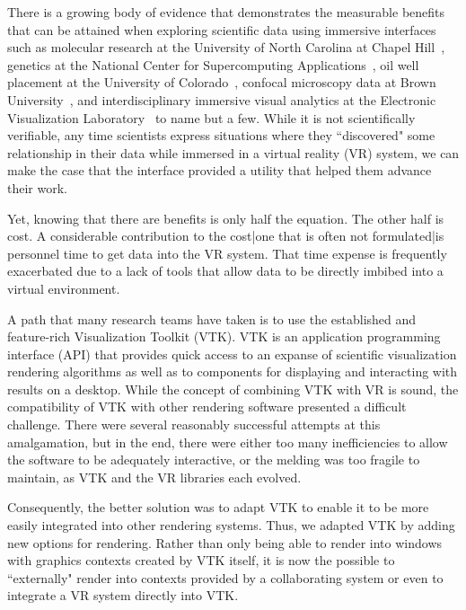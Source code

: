 There is a growing body of evidence that demonstrates the measurable benefits that can be
attained when exploring scientific data using immersive interfaces such as
molecular research at the University of North Carolina at Chapel Hill~\cite{Brooks:1990},
genetics at the National Center for Supercomputing Applications~\cite{Brady:1995},
oil well placement at the University of Colorado~\cite{Gruchalla:2004},  confocal microscopy data at Brown University~\cite{Prabhat:2008}, and interdisciplinary immersive visual analytics at the Electronic Visualization Laboratory~\cite{Marai:2016} to name but a few.
While it is not scientifically verifiable, any time scientists
express situations where they ``discovered" some relationship in their data
while immersed in a virtual reality (VR) system, we can make the case that the
interface provided a utility that helped them advance their work.

Yet, knowing that there are benefits is only half the equation.
The other half is cost.
A considerable contribution to the cost|one that is often not
formulated|is personnel time to get data into the VR system.
That time expense is frequently exacerbated due to a lack of tools that
allow data to be directly imbibed into a virtual environment.

A path that many research teams have taken is to use the established and
feature-rich Visualization Toolkit (VTK).
VTK is an application programming interface (API) that provides quick access to an expanse
of scientific visualization rendering algorithms as well as to components
for displaying and interacting with results on a desktop.
While the concept of combining VTK with VR is sound, the
compatibility of VTK with other rendering software presented a difficult
challenge.  
There were several reasonably successful attempts at this amalgamation,
but in the end, there were either too many inefficiencies to allow the
software to be adequately interactive, or the melding was too fragile to
maintain, as VTK and the VR libraries each evolved.

Consequently, the better solution was to adapt VTK to enable it to be
more easily integrated into other rendering systems.
Thus, we adapted VTK by adding new options for rendering.
Rather than only being able to render into windows with graphics contexts
created by VTK itself, it is now the possible to ``externally" render
into contexts provided by a collaborating system or even to integrate a
VR system directly into VTK.

